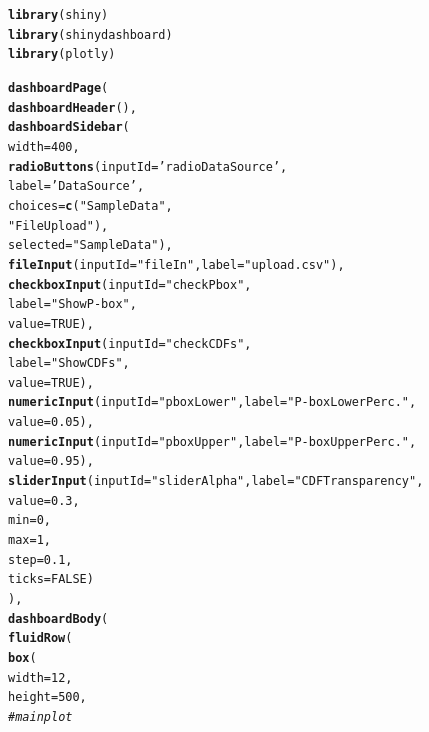 \documentclass[11pt]{asaproc}\usepackage[]{graphicx}\usepackage[]{color}
\makeatletter
\newcommand{\hlnum}[1]{\textcolor[rgb]{0.686,0.059,0.569}{#1}}%
\newcommand{\hlstr}[1]{\textcolor[rgb]{0.192,0.494,0.8}{#1}}%
\newcommand{\hlcom}[1]{\textcolor[rgb]{0.678,0.584,0.686}{\textit{#1}}}%
\newcommand{\hlstd}[1]{\textcolor[rgb]{0.345,0.345,0.345}{#1}}%
\newcommand{\hlkwc}[1]{\textcolor[rgb]{0.333,0.667,0.333}{#1}}%
\newcommand{\hlkwd}[1]{\textcolor[rgb]{0.737,0.353,0.396}{\textbf{#1}}}%
\newenvironment{kframe}{%
 \def\at@end@of@kframe{}%
 \ifinner\ifhmode%
  \def\at@end@of@kframe{\end{minipage}}%
  \begin{minipage}{\columnwidth}%
 \fi\fi%
 \def\FrameCommand##1{\hskip\@totalleftmargin \hskip-\fboxsep
 \colorbox{shadecolor}{##1}\hskip-\fboxsep
     \hskip-\linewidth \hskip-\@totalleftmargin \hskip\columnwidth}%
 \MakeFramed {\advance\hsize-\width
   \@totalleftmargin\z@ \linewidth\hsize
   \@setminipage}}%
 {\par\unskip\endMakeFramed%
 \at@end@of@kframe}
\newenvironment{knitrout}{}{} %
\makeatother
\begin{document}
%
\begin{knitrout}
\color{fgcolor}\begin{kframe}
\begin{alltt}
\hlkwd{library}\hlstd{(shiny)}
\hlkwd{library}\hlstd{(shinydashboard)}
\hlkwd{library}\hlstd{(plotly)}

\hlkwd{dashboardPage}\hlstd{(}
  \hlkwd{dashboardHeader}\hlstd{(),}
  \hlkwd{dashboardSidebar}\hlstd{(}
    \hlkwc{width} \hlstd{=} \hlnum{400}\hlstd{,}
    \hlkwd{radioButtons}\hlstd{(}\hlkwc{inputId} \hlstd{=} \hlstr{'radioDataSource'}\hlstd{,}
                 \hlkwc{label} \hlstd{=} \hlstr{'Data Source'}\hlstd{,}
                 \hlkwc{choices} \hlstd{=} \hlkwd{c}\hlstd{(}\hlstr{"Sample Data"}\hlstd{,}
                             \hlstr{"File Upload"}\hlstd{),}
                 \hlkwc{selected} \hlstd{=} \hlstr{"Sample Data"}\hlstd{),}
    \hlkwd{fileInput}\hlstd{(}\hlkwc{inputId} \hlstd{=} \hlstr{"fileIn"}\hlstd{,} \hlkwc{label} \hlstd{=} \hlstr{"upload .csv"}\hlstd{),}
    \hlkwd{checkboxInput}\hlstd{(}\hlkwc{inputId} \hlstd{=} \hlstr{"checkPbox"}\hlstd{,}
                  \hlkwc{label} \hlstd{=} \hlstr{"Show P-box"}\hlstd{,}
                  \hlkwc{value} \hlstd{=} \hlnum{TRUE}\hlstd{),}
    \hlkwd{checkboxInput}\hlstd{(}\hlkwc{inputId} \hlstd{=} \hlstr{"checkCDFs"}\hlstd{,}
                  \hlkwc{label} \hlstd{=} \hlstr{"Show CDFs"}\hlstd{,}
                  \hlkwc{value} \hlstd{=} \hlnum{TRUE}\hlstd{),}
    \hlkwd{numericInput}\hlstd{(}\hlkwc{inputId} \hlstd{=} \hlstr{"pboxLower"}\hlstd{,} \hlkwc{label} \hlstd{=} \hlstr{"P-box Lower Perc."}\hlstd{,}
                 \hlkwc{value} \hlstd{=} \hlnum{0.05}\hlstd{),}
    \hlkwd{numericInput}\hlstd{(}\hlkwc{inputId} \hlstd{=} \hlstr{"pboxUpper"}\hlstd{,} \hlkwc{label} \hlstd{=} \hlstr{"P-box Upper Perc."}\hlstd{,}
                 \hlkwc{value} \hlstd{=} \hlnum{0.95}\hlstd{),}
    \hlkwd{sliderInput}\hlstd{(}\hlkwc{inputId} \hlstd{=} \hlstr{"sliderAlpha"}\hlstd{,} \hlkwc{label} \hlstd{=} \hlstr{"CDF Transparency"}\hlstd{,}
                \hlkwc{value} \hlstd{=} \hlnum{0.3}\hlstd{,}
                \hlkwc{min} \hlstd{=} \hlnum{0}\hlstd{,}
                \hlkwc{max} \hlstd{=} \hlnum{1}\hlstd{,}
                \hlkwc{step} \hlstd{=} \hlnum{0.1}\hlstd{,}
                \hlkwc{ticks} \hlstd{=} \hlnum{FALSE}\hlstd{)}
  \hlstd{),}
  \hlkwd{dashboardBody}\hlstd{(}
    \hlkwd{fluidRow}\hlstd{(}
      \hlkwd{box}\hlstd{(}
        \hlkwc{width} \hlstd{=} \hlnum{12}\hlstd{,}
        \hlkwc{height} \hlstd{=} \hlnum{500}\hlstd{,}
        \hlcom{# main plot}

\end{alltt}
\end{kframe}
\end{knitrout}
\end{document}
